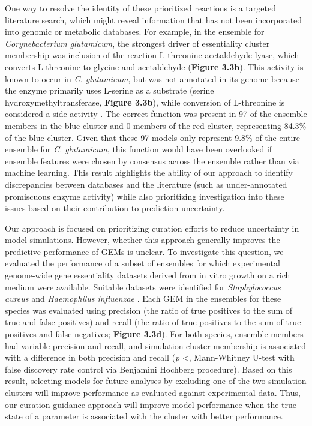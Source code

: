\documentclass[11pt,onecolumn,notitlepage,openany,twoside]{book}
\begin{document}
\begin{refsection}
One way to resolve the identity of these prioritized reactions is a targeted literature search, which might reveal information that has not been incorporated into genomic or metabolic databases. For example, in the ensemble for \textit{Corynebacterium glutamicum}, the strongest driver of essentiality cluster membership was inclusion of the reaction L-threonine acetaldehyde-lyase, which converts L-threonine to glycine and acetaldehyde (\textbf{Figure 3.3b}). This activity is known to occur in \textit{C. glutamicum}, but was not annotated in its genome because the enzyme primarily uses L-serine as a substrate (serine hydroxymethyltransferase, \textbf{Figure 3.3b}), while conversion of L-threonine is considered a side activity \cite{Dong2011-wt,Simic2002-ia}. The correct function was present in 97 of the ensemble members in the blue cluster and 0 members of the red cluster, representing 84.3\% of the blue cluster. Given that these 97 models only represent 9.8\% of the entire ensemble for \textit{C. glutamicum}, this function would have been overlooked if ensemble features were chosen by consensus across the ensemble rather than via machine learning. This result highlights the ability of our approach to identify discrepancies between databases and the literature (such as under-annotated promiscuous enzyme activity) while also prioritizing investigation into these issues based on their contribution to prediction uncertainty.

Our approach is focused on prioritizing curation efforts to reduce uncertainty in model simulations. However, whether this approach generally improves the predictive performance of GEMs is unclear. To investigate this question, we evaluated the performance of a subset of ensembles for which experimental genome-wide gene essentiality datasets derived from in vitro growth on a rich medium were available. Suitable datasets were identified for \textit{Staphylococcus aureus} \cite{Chaudhuri2009-za} and \textit{Haemophilus influenzae} \cite{Akerley2002-ja}. Each GEM in the ensembles for these species was evaluated using precision (the ratio of true positives to the sum of true and false positives) and recall (the ratio of true positives to the sum of true positives and false negatives; \textbf{Figure 3.3d}). For both species, ensemble members had variable precision and recall, and simulation cluster membership is associated with a difference in both precision and recall (\textit{p} \textless{}, Mann-Whitney U-test with false discovery rate control via Benjamini Hochberg procedure). Based on this result, selecting models for future analyses by excluding one of the two simulation clusters will improve performance as evaluated against experimental data. Thus, our curation guidance approach will improve model performance when the true state of a parameter is associated with the cluster with better performance.


\end{refsection}
\end{document}
